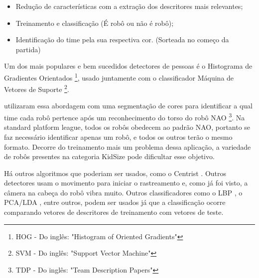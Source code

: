 \begin{itemize}
\item{Redução de características com a extração dos descritores mais relevantes;}
\item{Treinamento e classificação (É robô ou não é robô);}
\item{Identificação do time pela sua respectiva cor. (Sorteada no começo da partida)}
\end{itemize}

Um dos mais populares e bem sucedidos detectores de pessoas é o Histograma de Gradientes Orientados  \footnote{HOG - Do inglês: "Histogram of Oriented Gradients"}, usado juntamente com o classificador Máquina de Vetores de Suporte \footnote{SVM - Do inglês: "Support Vector Machine"}.

 utilizaram essa abordagem com uma segmentação de cores para identificar a qual time cada robô pertence após um reconhecimento do torso do robô NAO \cite{NAO}\footnote{TDP - Do inglês: "Team Description Papers"}. Na standard platform league, todos os robôs obedecem ao padrão NAO, portanto se faz necessário identificar apenas um robô, e todos os outros terão o mesmo formato. Decorre do treinamento mais um problema dessa aplicação, a variedade de robôs presentes na categoria KidSize pode dificultar esse objetivo.

Há outros algoritmos que poderiam ser usados, como o Centrist \cite{Wu}. Outros detectores usam o movimento para iniciar o rastreamento e, como já foi visto, a câmera na cabeça do robô vibra muito. Outros classificadores como o LBP \cite{Viola}, o PCA/LDA \cite{Martinez}, entre outros, podem ser usados já que a classificação ocorre comparando vetores de descritores de treinamento com vetores de teste.

